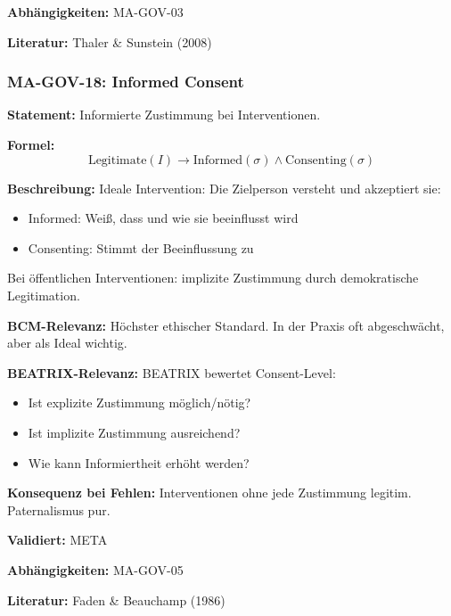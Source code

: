 \textbf{Abhängigkeiten:} MA-GOV-03

\textbf{Literatur:} Thaler \& Sunstein (2008)


\subsubsection*{MA-GOV-18: Informed Consent}

\textbf{Statement:} Informierte Zustimmung bei Interventionen.

\textbf{Formel:}
\begin{equation}
\text{Legitimate}(I) \rightarrow \text{Informed}(\sigma) \land \text{Consenting}(\sigma)
\end{equation}

\textbf{Beschreibung:}
Ideale Intervention: Die Zielperson versteht und akzeptiert sie:
\begin{itemize}
    \item Informed: Weiß, dass und wie sie beeinflusst wird
    \item Consenting: Stimmt der Beeinflussung zu
\end{itemize}
Bei öffentlichen Interventionen: implizite Zustimmung durch demokratische Legitimation.

\textbf{BCM-Relevanz:}
Höchster ethischer Standard. In der Praxis oft abgeschwächt, aber als Ideal wichtig.

\textbf{BEATRIX-Relevanz:}
BEATRIX bewertet Consent-Level:
\begin{itemize}
    \item Ist explizite Zustimmung möglich/nötig?
    \item Ist implizite Zustimmung ausreichend?
    \item Wie kann Informiertheit erhöht werden?
\end{itemize}

\textbf{Konsequenz bei Fehlen:}
Interventionen ohne jede Zustimmung legitim. Paternalismus pur.

\textbf{Validiert:} META

\textbf{Abhängigkeiten:} MA-GOV-05

\textbf{Literatur:} Faden \& Beauchamp (1986)


